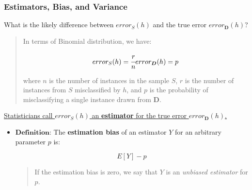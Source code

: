 \hypertarget{estimators-bias-and-variance}{%
\subsubsection{Estimators, Bias, and
Variance}\label{estimators-bias-and-variance}}

What is the likely difference between \(error_S(h)\) and the true error
\(error_{\boldsymbol{D}}(h)\)?

\begin{quote}
In terms of Binomial distribution, we have:

\[error_S(h)=\cfrac{r}{n}\\
error_{\boldsymbol{D}}(h)=p\]

where \(n\) is the number of instances in the sample \(S\), \(r\) is the
number of instances from \(S\) misclassified by \(h\), and \(p\) is the
probability of misclassifying a single instance drawn from
\(\boldsymbol{D}\).
\end{quote}

\underline{Statisticians call \(error_S(h)\) an \textbf{estimator} for the true error \(error_{\boldsymbol{D}}(h)\).}

\begin{itemize}
\item
  \(\textbf{Definition}\): The \textbf{estimation bias} of an estimator
  \(Y\) for an arbitrary parameter \(p\) is:

  \[E[Y]-p\]

  \begin{quote}
  If the estimation bias is zero, we say that \(Y\) is an \emph{unbiased
  estimator} for \(p\).
  \end{quote}
\end{itemize}

